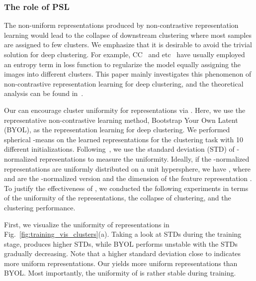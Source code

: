 \subsubsection{The role of PSL} 
The non-uniform representations produced by non-contrastive representation learning would lead to the collapse of downstream clustering where most samples are assigned to few clusters.
We emphasize that it is desirable to avoid the trivial solution for deep clustering. For example, CC~\cite{li2021contrastive} and etc~\cite{niu2020gatcluster,zhong2021graph} have usually employed an entropy term in loss function to regularize the model equally assigning the images into different clusters.
This paper mainly investigates this phenomenon of non-contrastive representation learning for deep clustering, and the theoretical analysis can be found in~\cite{zhang2022does,tian2021understanding}.

Our \methodname can encourage cluster uniformity for representations via \lossname.
Here, we use the representative non-contrastive learning method, Bootstrap Your Own Latent (BYOL), as the representation learning for deep clustering. We performed spherical -means on the learned representations for the clustering task with 10 different initializations. Following~\cite{chen2021exploring}, we use the standard deviation (STD) of -normalized representations to measure the uniformity. Ideally, if the -normalized representations are uniformly distributed on a unit hypersphere, we have , where  and  are the -normalized version and the dimension of the feature representation . To justify the effectiveness of \methodname, we conducted the following experiments in terms of the uniformity of the representations, the collapse of clustering, and the clustering performance.

First, we visualize the uniformity of representations in Fig.~\ref{fig:training_vis_clusters}(a). Taking a look at STDs during the training stage, \methodname produces higher STDs, while BYOL performs unstable with the STDs gradually decreasing.
Note that a higher standard deviation close to  indicates more uniform representations. Our \methodname yields more uniform representations than BYOL. Most importantly, the uniformity of \methodname is rather stable during training.  

